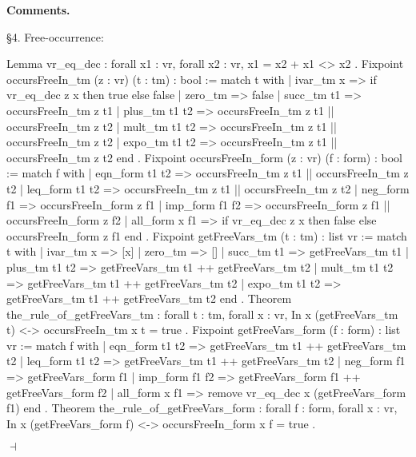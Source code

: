 \documentclass[12pt]{paper}
\newenvironment{context}[1][]
{ \noindent \textbf{{#1}.}
}
{ \hfill $ \dashv $
}
\begin{document}
\begin{context}[Comments]
    \S4. Free-occurrence:
    \begin{coqcode}
Lemma vr_eq_dec :
  forall x1 : vr,
  forall x2 : vr,
  {x1 = x2} + {x1 <> x2}
.
Fixpoint occursFreeIn_tm (z : vr) (t : tm) : bool :=
  match t with
  | ivar_tm x => if vr_eq_dec z x then true else false
  | zero_tm => false
  | succ_tm t1 => occursFreeIn_tm z t1
  | plus_tm t1 t2 => occursFreeIn_tm z t1 || occursFreeIn_tm z t2
  | mult_tm t1 t2 => occursFreeIn_tm z t1 || occursFreeIn_tm z t2
  | expo_tm t1 t2 => occursFreeIn_tm z t1 || occursFreeIn_tm z t2
  end
.
Fixpoint occursFreeIn_form (z : vr) (f : form) : bool :=
  match f with
  | eqn_form t1 t2 => occursFreeIn_tm z t1 || occursFreeIn_tm z t2
  | leq_form t1 t2 => occursFreeIn_tm z t1 || occursFreeIn_tm z t2
  | neg_form f1 => occursFreeIn_form z f1
  | imp_form f1 f2 => occursFreeIn_form z f1 || occursFreeIn_form z f2
  | all_form x f1 => if vr_eq_dec z x then false else occursFreeIn_form z f1
  end
.
Fixpoint getFreeVars_tm (t : tm) : list vr :=
  match t with
  | ivar_tm x => [x]
  | zero_tm => []
  | succ_tm t1 => getFreeVars_tm t1
  | plus_tm t1 t2 => getFreeVars_tm t1 ++ getFreeVars_tm t2
  | mult_tm t1 t2 => getFreeVars_tm t1 ++ getFreeVars_tm t2
  | expo_tm t1 t2 => getFreeVars_tm t1 ++ getFreeVars_tm t2
  end
.
Theorem the_rule_of_getFreeVars_tm :
  forall t : tm,
  forall x : vr,
  In x (getFreeVars_tm t) <-> occursFreeIn_tm x t = true
.
Fixpoint getFreeVars_form (f : form) : list vr :=
  match f with
  | eqn_form t1 t2 => getFreeVars_tm t1 ++ getFreeVars_tm t2
  | leq_form t1 t2 => getFreeVars_tm t1 ++ getFreeVars_tm t2
  | neg_form f1 => getFreeVars_form f1
  | imp_form f1 f2 => getFreeVars_form f1 ++ getFreeVars_form f2
  | all_form x f1 => remove vr_eq_dec x (getFreeVars_form f1)
  end
.
Theorem the_rule_of_getFreeVars_form :
  forall f : form,
  forall x : vr,
  In x (getFreeVars_form f) <-> occursFreeIn_form x f = true
.
    \end{coqcode}


\end{context}
\end{document}
